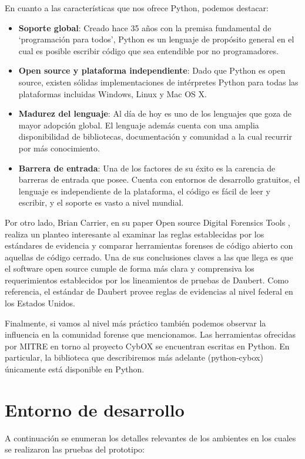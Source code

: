 En cuanto a las características que nos ofrece Python, podemos destacar:

\begin{itemize}
\item \textbf{Soporte global}: Creado hace 35 años con la premisa fundamental de \enquote*{programación para todos}, Python es un lenguaje de propósito general en el cual es posible escribir código que sea entendible por no programadores.
\item \textbf{Open source y plataforma independiente}: Dado que Python es open source, existen sólidas implementaciones de intérpretes Python para todas las plataformas incluidas Windows, Linux y Mac OS X.
\item \textbf{Madurez del lenguaje}: Al día de hoy es uno de los lenguajes que goza de mayor adopción global. El lenguaje además cuenta con una amplia disponibilidad de bibliotecas, documentación y comunidad a la cual recurrir por más conocimiento.
\item \textbf{Barrera de entrada}: Una de los factores de su éxito es la carencia de barreras de entrada que posee. Cuenta con entornos de desarrollo gratuitos, el lenguaje es independiente de la plataforma, el código es fácil de leer y escribir, y el soporte es vasto a nivel mundial.
\end{itemize}

Por otro lado, Brian Carrier, en su paper Open source Digital Forensics Tools \cite{opendftool}, realiza un planteo interesante al examinar las reglas establecidas por los estándares de evidencia y comparar herramientas forenses de código abierto con aquellas de código cerrado. Una de sus conclusiones claves a las que llega es que el software open source cumple de forma más clara y comprensiva los requerimientos establecidos por los lineamientos de pruebas de Daubert. Como referencia, el estándar de Daubert provee reglas de evidencias al nivel federal en los Estados Unidos.

Finalmente, si vamos al nivel más práctico también podemos observar la influencia en la comunidad forense que mencionamos. Las herramientas ofrecidas por MITRE en torno al proyecto CybOX se encuentran escritas en Python. En particular, la biblioteca que describiremos más adelante (python-cybox) únicamente está disponible en Python.

\section{Entorno de desarrollo}
A continuación se enumeran los detalles relevantes de los ambientes en los cuales se realizaron las pruebas del prototipo:

